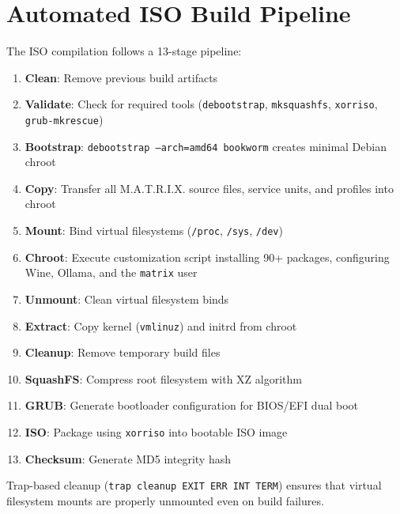 \documentclass[conference]{IEEEtran}
\begin{document}

\section{Automated ISO Build Pipeline}
\label{sec:build}

The ISO compilation follows a 13-stage pipeline:

\begin{enumerate}[label=\textbf{S\arabic*}:]
    \item \textbf{Clean}: Remove previous build artifacts
    \item \textbf{Validate}: Check for required tools (\texttt{debootstrap}, \texttt{mksquashfs}, \texttt{xorriso}, \texttt{grub-mkrescue})
    \item \textbf{Bootstrap}: \texttt{debootstrap --arch=amd64 bookworm} creates minimal Debian chroot
    \item \textbf{Copy}: Transfer all M.A.T.R.I.X. source files, service units, and profiles into chroot
    \item \textbf{Mount}: Bind virtual filesystems (\texttt{/proc}, \texttt{/sys}, \texttt{/dev})
    \item \textbf{Chroot}: Execute customization script installing 90+ packages, configuring Wine, Ollama, and the \texttt{matrix} user
    \item \textbf{Unmount}: Clean virtual filesystem binds
    \item \textbf{Extract}: Copy kernel (\texttt{vmlinuz}) and initrd from chroot
    \item \textbf{Cleanup}: Remove temporary build files
    \item \textbf{SquashFS}: Compress root filesystem with XZ algorithm
    \item \textbf{GRUB}: Generate bootloader configuration for BIOS/EFI dual boot
    \item \textbf{ISO}: Package using \texttt{xorriso} into bootable ISO image
    \item \textbf{Checksum}: Generate MD5 integrity hash
\end{enumerate}

Trap-based cleanup (\texttt{trap cleanup EXIT ERR INT TERM}) ensures that virtual filesystem mounts are properly unmounted even on build failures.
\end{document}
